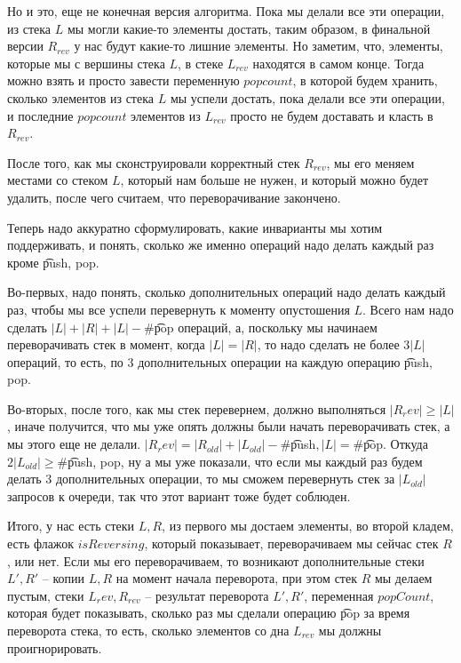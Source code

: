 Но и это, еще не конечная версия алгоритма. Пока мы делали все эти операции, из стека $L$ мы могли какие-то элементы достать,
таким образом, в финальной версии $R_{rev}$ у нас будут какие-то лишние элементы. 
Но заметим, что, элементы, которые мы с вершины стека $L$, в стеке $L_{rev}$ находятся в самом конце.
Тогда можно взять и просто завести переменную $popcount$, в которой будем хранить, сколько элементов из стека $L$ мы успели достать, пока делали
все эти операции, и последние $popcount$ элементов из $L_{rev}$ просто не будем доставать и класть в $R_{rev}$.

После того, как мы сконструировали корректный стек $R_{rev}$, мы его меняем местами со стеком $L$, который нам больше не нужен, и который можно будет
удалить, после чего считаем, что переворачивание закончено.

Теперь надо аккуратно сформулировать, какие инварианты мы хотим поддерживать, и понять, сколько же именно операций надо делать каждый раз кроме
\t{push, pop}.
                
Во-первых, надо понять, сколько дополнительных операций надо делать каждый раз, чтобы мы все успели перевернуть к моменту опустошения $L$.
Всего нам надо сделать $|L| + |R| + |L| - \#$\t{pop} операций, а, поскольку мы начинаем переворачивать стек в момент, когда $|L| = |R|$, то
надо сделать не более $3|L|$ операций, то есть, по 3 дополнительных операции на каждую операцию \t{push, pop}.

Во-вторых, после того, как мы стек перевернем, должно выполняться $|R_rev| \ge |L|$, иначе получится, что мы уже опять должны были начать переворачивать
стек, а мы этого еще не делали.
$|R_rev| = |R_{old}| + |L_{old}| - \#$\t{push}$, |L| = \#$\t{pop}. 
Откуда $2|L_{old}| \ge \#$\t{push, pop}, ну а мы уже показали, что если мы каждый раз будем делать 3 дополнительных операции, то мы сможем перевернуть
стек за $|L_{old}|$ запросов к очереди, так что этот вариант тоже будет соблюден.

Итого, у нас есть стеки $L, R$, из первого мы достаем элементы, во второй кладем, есть флажок $isReversing$, который показывает, переворачиваем мы сейчас
стек $R$, или нет.
Если мы его переворачиваем, то возникают дополнительные стеки $L', R'$ -- копии $L, R$ на момент начала переворота, при этом стек $R$ мы делаем пустым,
стеки $L_rev, R_{rev}$ -- результат переворота $L', R'$, переменная $popCount$, которая будет показывать, сколько раз мы сделали операцию \t{pop} за время 
переворота стека, то есть, сколько элементов со дна $L_{rev}$ мы должны проигнорировать.

